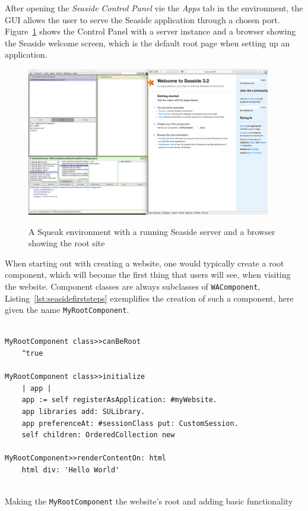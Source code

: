\documentclass[a4paper,12pt,pagesize,headsepline,titlepage]{scrartcl}
\begin{document}
After opening the \emph{Seaside Control Panel} vie the \emph{Apps} tab in the environment, the GUI allows the user to serve the Seaside application through a chosen port. Figure~\ref{abb:start} shows the Control Panel with a server instance and a browser showing the Seaside welcome screen, which is the default root page when setting up an application.

\begin{figure}[h]
\begin{center}
\includegraphics*[width=0.95\textwidth]{images/started.png}\\
\caption{A Squeak environment with a running Seaside server and a browser showing the root site}
\label{abb:start}
\end{center}
\end{figure}

When starting out with creating a website, one would typically create a root component, which will become the first thing that users will see, when visiting the website. Component classes are always subclasses of \texttt{WAComponent}, Listing~\ref{lst:seasidefirststeps} exemplifies the creation of such a component, here given the name \texttt{MyRootComponent}. 

\begin{listing}[]%
\begin{verbatim}

MyRootComponent class>>canBeRoot
    ^true
    
MyRootComponent class>>initialize
    | app |
    app := self registerAsApplication: #myWebsite.
    app libraries add: SULibrary.
    app preferenceAt: #sessionClass put: CustomSession.
    self children: OrderedCollection new
    
MyRootComponent>>renderContentOn: html
    html div: 'Hello World'
    
\end{verbatim}
\caption{Making the \texttt{MyRootComponent} the website's root and adding basic functionality}
\label{lst:seasidefirststeps}
\end{listing}
\end{document}
